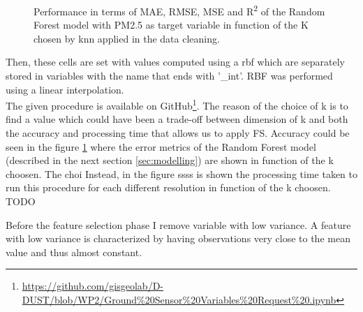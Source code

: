 \begin{figure}[H] 
    \centering
    \hfill%
    \caption{Performance in terms of MAE, RMSE, MSE and R\textsuperscript{2} of the Random Forest model with PM2.5 as target variable in function of the K chosen by \acrshort{knn} applied in the data cleaning.}
    \label{fig:knn_chosen}
\end{figure}
Then, these cells are set with values computed using a \gls{rbf} \cite{wright2003radial} which are separately stored in variables with the name that ends with '\_int'. RBF was performed using a linear interpolation.\\
The given procedure is available on GitHub\footnote{\url{https://github.com/gisgeolab/D-DUST/blob/WP2/Ground\%20Sensor\%20Variables\%20Request\%20.ipynb}}.
The reason of the choice of k is to find a value which could have been a trade-off between dimension of k and both the accuracy and processing time that allows us to apply FS.
Accuracy could be seen in the figure \ref{fig:knn_chosen} where the error metrics of the Random Forest model (described in the next section \ref{sec:modelling}) are shown in function of the k choosen.
The choi
Instead, in the figure ssss is shown the processing time taken to run this procedure for each different resolution in function of the k choosen. 
TODO
\par
Before the feature selection phase I remove variable with low variance.
A feature with low variance is characterized by having observations very close to the mean value and thus almost constant.
